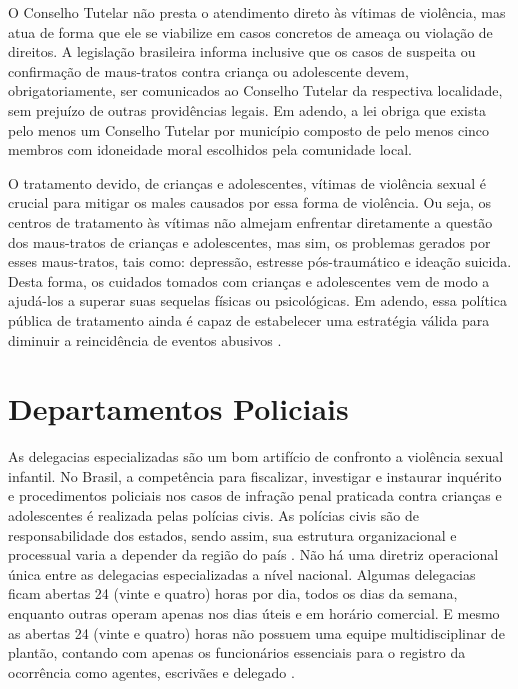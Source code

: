 O Conselho Tutelar não presta o atendimento direto às vítimas de violência, mas atua de forma que ele se viabilize em casos concretos de ameaça ou violação de direitos. A legislação brasileira informa inclusive que os casos de suspeita ou confirmação de maus-tratos contra criança ou adolescente devem, obrigatoriamente, ser comunicados ao Conselho Tutelar da respectiva localidade, sem prejuízo de outras providências legais. Em adendo, a lei obriga que exista pelo menos um Conselho Tutelar por município composto de pelo menos cinco membros com idoneidade moral escolhidos pela comunidade local. 

O tratamento devido, de crianças e adolescentes, vítimas de violência sexual é crucial para mitigar os males causados por essa forma de violência. Ou seja, os centros de tratamento às vítimas não almejam enfrentar diretamente a questão dos maus-tratos de crianças e adolescentes, mas sim, os problemas gerados por esses maus-tratos, tais como: depressão, estresse pós-traumático e ideação suicida. Desta forma, os cuidados tomados com crianças e adolescentes vem de modo a ajudá-los a superar suas sequelas físicas ou psicológicas. Em adendo, essa política pública de tratamento ainda é capaz de estabelecer uma estratégia válida para diminuir a reincidência de eventos abusivos \cite{costa2019maus}.


\section{Departamentos Policiais}\label{sec:dp}

As delegacias especializadas são um bom artifício de confronto a violência sexual infantil. No Brasil, a competência para fiscalizar, investigar e instaurar inquérito e procedimentos policiais nos casos de infração penal praticada contra crianças e adolescentes é realizada pelas polícias civis. As polícias civis são de responsabilidade dos estados, sendo assim, sua estrutura organizacional e processual varia a depender da região do país \cite{rodrigues2014violencia}. Não há uma diretriz operacional única entre as delegacias especializadas a nível nacional. Algumas delegacias ficam abertas 24 (vinte e quatro) horas por dia, todos os dias da semana, enquanto outras operam apenas nos dias úteis e em horário comercial. E mesmo as abertas 24 (vinte e quatro) horas não possuem uma equipe multidisciplinar de plantão, contando com apenas os funcionários essenciais para o registro da ocorrência como agentes, escrivães e delegado \cite{brasil2016estudo}.


